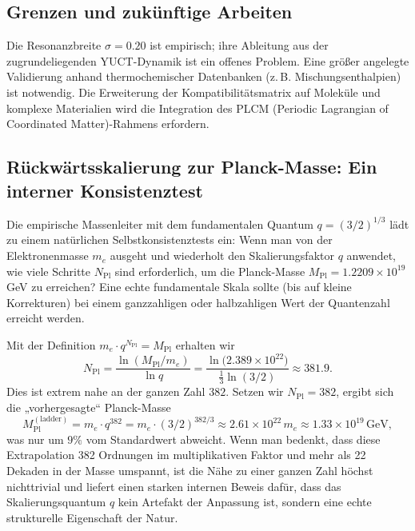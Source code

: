 \documentclass[11pt,a4paper]{article}
\newcommand{\Mpl}{M_{\mathrm{Pl}}}
\begin{document}
	\subsection{Grenzen und zukünftige Arbeiten}
	
	Die Resonanzbreite \(\sigma = 0.20\) ist empirisch; ihre Ableitung aus der zugrundeliegenden YUCT-Dynamik ist ein offenes Problem. Eine größer angelegte Validierung anhand thermochemischer Datenbanken (z. B. Mischungsenthalpien) ist notwendig. Die Erweiterung der Kompatibilitätsmatrix auf Moleküle und komplexe Materialien wird die Integration des PLCM (Periodic Lagrangian of Coordinated Matter)-Rahmens erfordern.
	
	\subsection{Rückwärtsskalierung zur Planck-Masse: Ein interner Konsistenztest}
	\label{subsec:reverse}
	
	Die empirische Massenleiter mit dem fundamentalen Quantum $q = (3/2)^{1/3}$ lädt zu einem natürlichen Selbstkonsistenztests ein: Wenn man von der Elektronenmasse $m_e$ ausgeht und wiederholt den Skalierungsfaktor $q$ anwendet, wie viele Schritte $N_{\mathrm{Pl}}$ sind erforderlich, um die Planck-Masse $\Mpl = 1.2209\times10^{19}$ GeV zu erreichen? Eine echte fundamentale Skala sollte (bis auf kleine Korrekturen) bei einem ganzzahligen oder halbzahligen Wert der Quantenzahl erreicht werden.
	
	Mit der Definition $m_e \cdot q^{N_{\mathrm{Pl}}} = \Mpl$ erhalten wir
	\begin{equation}
		N_{\mathrm{Pl}} = \frac{\ln(\Mpl/m_e)}{\ln q}
		= \frac{\ln\!\big(2.389\times10^{22}\big)}{\frac13\ln(3/2)}
		\approx 381.9.
		\label{eq:Npl}
	\end{equation}
	Dies ist extrem nahe an der ganzen Zahl $382$. Setzen wir $N_{\mathrm{Pl}} = 382$, ergibt sich die „vorhergesagte“ Planck-Masse
	\begin{equation}
		\Mpl^{\mathrm{(ladder)}} = m_e \cdot q^{382}
		= m_e \cdot (3/2)^{382/3}
		\approx 2.61\times10^{22}\,m_e
		\approx 1.33\times10^{19}\,\text{GeV},
		\label{eq:Mpl_ladder}
	\end{equation}
	was nur um $9\%$ vom Standardwert abweicht. Wenn man bedenkt, dass diese Extrapolation 382 Ordnungen im multiplikativen Faktor und mehr als 22 Dekaden in der Masse umspannt, ist die Nähe zu einer ganzen Zahl höchst nichttrivial und liefert einen starken internen Beweis dafür, dass das Skalierungsquantum $q$ kein Artefakt der Anpassung ist, sondern eine echte strukturelle Eigenschaft der Natur.
	
\end{document}
